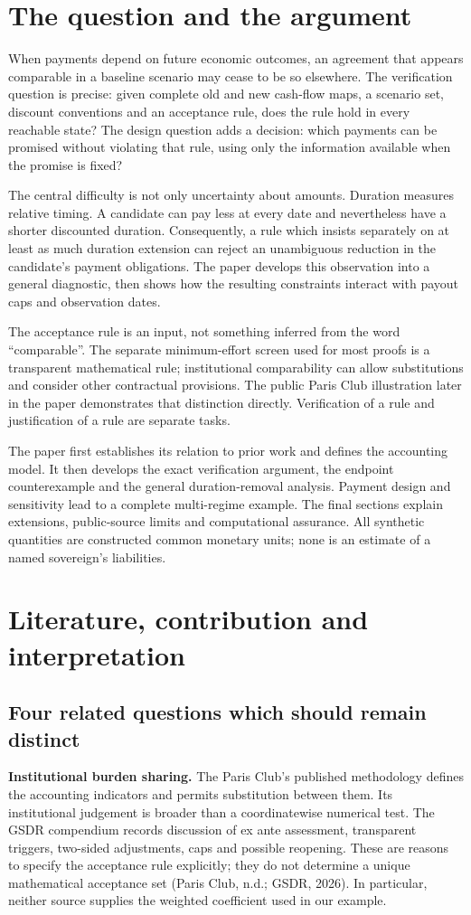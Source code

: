 \documentclass[11pt,a4paper]{article}
\begin{document}
\section{The question and the argument}
When payments depend on future economic outcomes, an agreement that appears comparable in a baseline scenario may cease to be so elsewhere. The verification question is precise: given complete old and new cash-flow maps, a scenario set, discount conventions and an acceptance rule, does the rule hold in every reachable state? The design question adds a decision: which payments can be promised without violating that rule, using only the information available when the promise is fixed?

The central difficulty is not only uncertainty about amounts. Duration measures relative timing. A candidate can pay less at every date and nevertheless have a shorter discounted duration. Consequently, a rule which insists separately on at least as much duration extension can reject an unambiguous reduction in the candidate's payment obligations. The paper develops this observation into a general diagnostic, then shows how the resulting constraints interact with payout caps and observation dates.

The acceptance rule is an input, not something inferred from the word ``comparable''. The separate minimum-effort screen used for most proofs is a transparent mathematical rule; institutional comparability can allow substitutions and consider other contractual provisions. The public Paris Club illustration later in the paper demonstrates that distinction directly. Verification of a rule and justification of a rule are separate tasks.

The paper first establishes its relation to prior work and defines the accounting model. It then develops the exact verification argument, the endpoint counterexample and the general duration-removal analysis. Payment design and sensitivity lead to a complete multi-regime example. The final sections explain extensions, public-source limits and computational assurance. All synthetic quantities are constructed common monetary units; none is an estimate of a named sovereign's liabilities.

\section{Literature, contribution and interpretation}\label{sec:literature}
\subsection{Four related questions which should remain distinct}
\textbf{Institutional burden sharing.} The Paris Club's published methodology defines the accounting indicators and permits substitution between them. Its institutional judgement is broader than a coordinatewise numerical test. The GSDR compendium records discussion of ex ante assessment, transparent triggers, two-sided adjustments, caps and possible reopening. These are reasons to specify the acceptance rule explicitly; they do not determine a unique mathematical acceptance set (Paris Club, n.d.; GSDR, 2026). In particular, neither source supplies the weighted coefficient used in our example.
\end{document}
